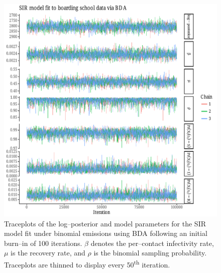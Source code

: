 \begin{figure}[htbp]
	\centering
	\includegraphics[width=\linewidth]{figures/bbs_sir_bda_traceplots.pdf}
	\caption[Traceplots for SIR model parameters fit to the boarding school data using Bayesian data augmentation.]{Traceplots of the log--posterior and model parameters for the SIR model fit under binomial emissions using BDA following an initial burn--in of 100 iterations. $ \beta $ denotes the per--contact infectivity rate, $ \mu $ is the recovery rate, and $ \rho $ is the binomial sampling probability. Traceplots are thinned to display every 50\textsuperscript{th} iteration.}
	\label{fig:bbs_sir_bda_traceplots}
\end{figure}

